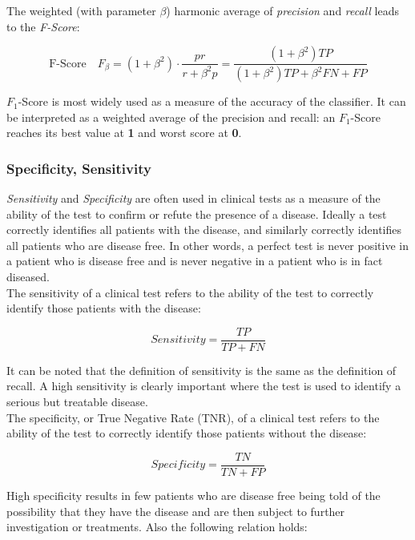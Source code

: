 The weighted (with parameter $\beta$) harmonic average of \textit{precision} and \textit{recall} leads to the \textit{F-Score}\cite{InfoRetrieval}:

\begin{equation}
 \textrm{F-Score} \quad F_{\beta} =  (1+\beta^{2}) \cdot \frac{pr}{r + \beta^{2}p} = \frac{(1+\beta^{2})TP}{(1+\beta^{2})TP + \beta^{2}FN + FP}
\end{equation}

$F_1$-Score is most widely used as a measure of the accuracy of the classifier.
It can be interpreted as a weighted average of the precision and recall: an $F_1$-Score reaches its best value at \textbf{1} and worst score at \textbf{0}.

\vspace{0.5cm}

\subsubsection{Specificity, Sensitivity}

\textit{Sensitivity} and \textit{Specificity} are often used in clinical tests as a measure of the ability of the test to confirm or 
refute the presence of a disease\cite{sensSpec}.
Ideally a test correctly identifies all patients with the disease, and similarly correctly identifies all patients who are
disease free. In other words, a perfect test is never positive in a patient who is disease free and is never negative in a patient who is in fact diseased.\\
The sensitivity of a clinical test refers to the ability of the test to correctly identify those patients with the disease:

\begin{equation}
 Sensitivity = \frac{TP}{TP + FN}
\end{equation}

It can be noted that the definition of sensitivity is the same as the definition of recall.
A high sensitivity is clearly important where the test is used to identify a serious but treatable disease.\\
The specificity, or True Negative Rate (TNR), of a clinical test refers to the ability of the test to correctly identify those patients without the disease:

\begin{equation}
 Specificity = \frac{TN}{TN + FP}
\end{equation}

High specificity results in few patients who are disease free being told of the possibility that they have the disease and are
then subject to further investigation or treatments. Also the following relation holds:

